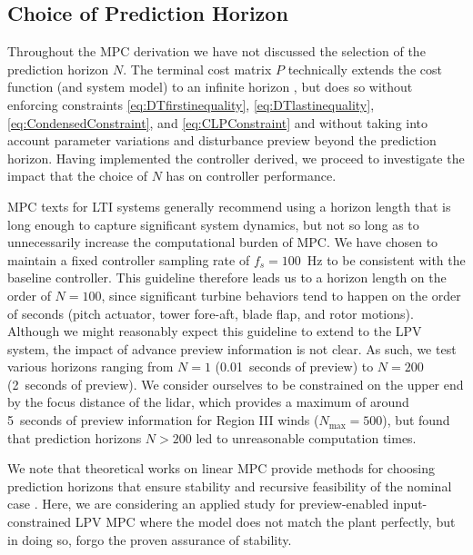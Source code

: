 \documentclass[letterpaper, 10 pt, conference]{ieeeconf}  %
\begin{document}
\subsection{Choice of Prediction Horizon}
Throughout the MPC derivation we have not discussed the selection of the prediction horizon $N$. The terminal cost matrix $P$ technically extends the cost function (and system model) to an infinite horizon \cite{Rawlings2000}, but does so without enforcing constraints \eqref{eq:DTfirstinequality}, \eqref{eq:DTlastinequality}, \eqref{eq:CondensedConstraint}, and \eqref{eq:CLPConstraint} and without taking into account parameter variations and disturbance preview beyond the prediction horizon. Having implemented the controller derived, we proceed to investigate the impact that the choice of $N$ has on controller performance.%

MPC texts for LTI systems \cite{Rossiter2018}\cite{Seborg2011} generally recommend using a horizon length that is long enough to capture significant system dynamics, but not so long as to unnecessarily increase the computational burden of MPC. We have chosen to maintain a fixed controller sampling rate of $f_s = 100$~Hz to be consistent with the baseline controller. This guideline therefore leads us to a horizon length on the order of $N=100$, since significant turbine behaviors tend to happen on the order of seconds (pitch actuator, tower fore-aft, blade flap, and rotor motions). Although we might reasonably expect this guideline to extend to the LPV system, the impact of advance preview information is not clear. As such, we test various horizons ranging from $N = 1$ (0.01~seconds of preview) to $N = 200$ (2~seconds of preview). We consider ourselves to be constrained on the upper end by the focus distance of the lidar, which provides a maximum of around 5~seconds of preview information for Region III winds ($N_\mathrm{max} = 500$), but found that prediction horizons $N > 200$ led to unreasonable computation times. 

We note that theoretical works on linear MPC provide methods for choosing prediction horizons that ensure stability and recursive feasibility of the nominal case \cite{Rossiter2018}\cite{Rawlings2000}. Here, we are considering an applied study for preview-enabled input-constrained LPV MPC where the model does not match the plant perfectly, but in doing so, forgo the proven assurance of stability.
\end{document}
